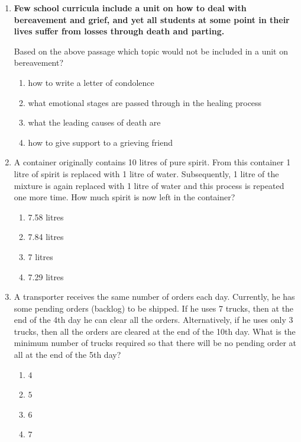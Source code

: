 \documentclass[journal,12pt,onecolumn]{IEEEtran}
\theoremstyle{remark}
\begin{document}
\begin{enumerate}
\item \textbf{Few school curricula include a unit on how to deal with bereavement and grief, and yet all students at some point in their lives suffer from losses through death and parting.}

Based on the above passage which topic would not be included in a unit on bereavement?

\hfill{}
\begin{enumerate}
\item how to write a letter of condolence
\item what emotional stages are passed through in the healing process
\item what the leading causes of death are
\item how to give support to a grieving friend
\end{enumerate}

\item A container originally contains 10 litres of pure spirit. From this container 1 litre of spirit is replaced with 1 litre of water. Subsequently, 1 litre of the mixture is again replaced with 1 litre of water and this process is repeated one more time. How much spirit is now left in the container?

\hfill{}
\begin{enumerate}
\item 7.58 litres
\item 7.84 litres
\item 7 litres
\item 7.29 litres
\end{enumerate}

\item A transporter receives the same number of orders each day. Currently, he has some pending orders (backlog) to be shipped. If he uses 7 trucks, then at the end of the 4th day he can clear all the orders. Alternatively, if he uses only 3 trucks, then all the orders are cleared at the end of the 10th day. What is the minimum number of trucks required so that there will be no pending order at all at the end of the 5th day?

\hfill{}
\begin{enumerate}
\item $4$
\item $5$
\item $6$
\item $7$
\end{enumerate}


\end{enumerate}
\end{document}
